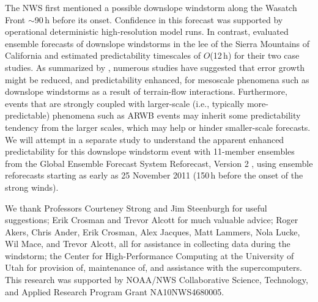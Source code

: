 \documentclass[pdftex,12pt]{article}
\def\around{$\sim$}
\begin{document}
The NWS first mentioned a possible downslope windstorm along the Wasatch Front \around 90\,h before its onset. Confidence in this forecast was supported by operational deterministic high-resolution model runs. In contrast, \citet{Reinecke2009} evaluated ensemble forecasts of downslope windstorms in the lee of the Sierra Mountains of California and estimated predictability timescales of $O$(12\,h) for their two case studies. As summarized by \citet{Doyle2013}, numerous studies have suggested that error growth might be reduced, and predictability enhanced, for mesoscale phenomena such as downslope windstorms as a result of terrain-flow interactions. Furthermore, events that are strongly coupled with larger-scale (i.e., typically more-predictable) phenomena such as ARWB events may inherit some predictability tendency from the larger scales, which may help \citep{Palmer1993} or hinder \citep{Durran2014-qf} smaller-scale forecasts. We will attempt in a separate study to understand the apparent enhanced predictability for this downslope windstorm event with 11-member ensembles from the Global Ensemble Forecast System Reforecast, Version 2 \citep{Hamill2013-tt}, using ensemble reforecasts starting as early as 25 November 2011 (150\,h before the onset of the strong winds). 


\begin{acknowledgment} 
We thank Professors Courteney Strong and Jim Steenburgh for useful suggestions; Erik Crosman and Trevor Alcott for much valuable advice; Roger Akers, Chris Ander, Erik Crosman, Alex Jacques, Matt Lammers, Nola Lucke, Wil Mace, and Trevor Alcott, all for assistance in collecting data during the windstorm; the Center for High-Performance Computing at the University of Utah for provision of, maintenance of, and assistance with the supercomputers. This research was supported by NOAA/NWS Collaborative Science, Technology, and Applied Research Program Grant NA10NWS4680005.
\end{acknowledgment}

{}
{\clearpage}

{}
{\clearpage}



\end{document}

